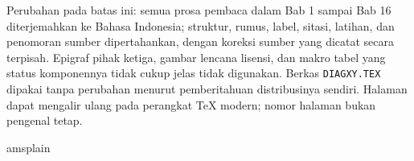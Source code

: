 \documentclass[11pt,reqno]{amsbook}
\theoremstyle{definition}
\theoremstyle{remark}
\numberwithin{equation}{section}
\begin{document}
Perubahan pada batas ini: semua prosa pembaca dalam Bab 1 sampai Bab 16
diterjemahkan ke Bahasa Indonesia; struktur, rumus, label, sitasi, latihan,
dan penomoran sumber dipertahankan, dengan koreksi sumber yang dicatat secara
terpisah. Epigraf pihak ketiga, gambar lencana lisensi, dan makro tabel yang
status komponennya tidak cukup jelas tidak digunakan. Berkas
\texttt{DIAGXY.TEX} dipakai tanpa perubahan menurut pemberitahuan distribusinya
sendiri. Halaman dapat
mengalir ulang pada perangkat TeX modern; nomor halaman bukan pengenal tetap.



\vfill\eject

\tableofcontents




\mainmatter




 
 
 
 
 
 
 
 
 
 
 
 
 
 
 
 






\backmatter


 \clearpage
  {amsplain}
 


 \cleardoublepage
 \printindex
\end{document}

